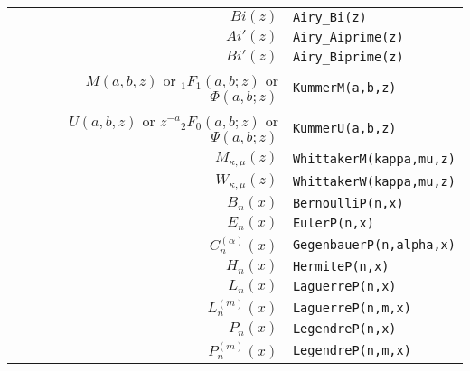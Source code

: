 {\begin{tabular}{r l}
$Bi(z)$ & {\tt Airy\_Bi(z)}\\
$Ai'(z)$ & {\tt Airy\_Aiprime(z)}\\
$Bi'(z)$ & {\tt Airy\_Biprime(z)}\\
$M(a, b, z)$ or $_1F_1(a, b; z)$ or $\Phi(a, b; z)$ &
{\tt KummerM(a,b,z)} \\
$U(a, b, z)$ or $z^{-a}{_2F_0(a, b; z)}$ or $\Psi(a, b; z)$ &
{\tt KummerU(a,b,z)}\\
$M_{\kappa,\mu}(z)$ & {\tt WhittakerM(kappa,mu,z)}\\
$W_{\kappa,\mu}(z)$ & {\tt WhittakerW(kappa,mu,z)}\\
$B_n(x)$ & {\tt BernoulliP(n,x)}\\
$E_n(x)$ & {\tt EulerP(n,x)}\\
$C_n^{(\alpha)}(x)$ & {\tt GegenbauerP(n,alpha,x)}\\
$H_n(x)$ & {\tt HermiteP(n,x)}\\
$L_n(x)$ & {\tt LaguerreP(n,x)}\\
$L_n^{(m)}(x)$ & {\tt LaguerreP(n,m,x)}\\
$P_n(x)$ & {\tt LegendreP(n,x)}\\
$P_n^{(m)}(x)$ & {\tt LegendreP(n,m,x)}\\
\end{tabular}}

